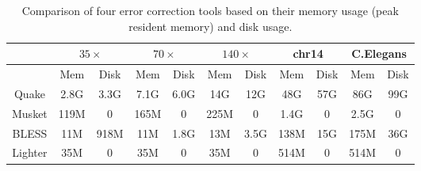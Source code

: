 \documentclass{bmcart}
\begin{document}
\begin{backmatter}
\begin{table}[h!] %
\caption{Comparison of four error correction tools based on their memory usage (peak resident memory) and disk usage.\label{table:memory_usage}}
\begin{tabular}{|c|c|c||c|c||c|c||c|c||c|c|} \hline
		& \multicolumn{2}{|c||}{$35\times$} & \multicolumn{2}{|c||}{$70\times$}  & \multicolumn{2}{|c||}{$140\times$} & \multicolumn{2}{|c||}{chr14}  & \multicolumn{2}{|c|}{C.Elegans} \\ \hline
		& Mem & Disk & Mem & Disk & Mem & Disk & Mem & Disk & Mem & Disk \\ \hline
Quake   & 2.8G	& 3.3G & 7.1G & 6.0G & 14G & 12G & 48G & 57G & 86G & 99G \\ \hline		
Musket	& 119M	& 0 & 165M & 0 & 225M & 0 & 1.4G & 0 & 2.5G & 0 \\ \hline
BLESS	& 11M	& 918M & 11M & 1.8G & 13M & 3.5G & 138M & 15G & 175M & 36G \\ \hline
Lighter	& 35M	& 0 & 35M & 0 & 35M & 0 & 514M & 0 & 514M & 0 \\ \hline
\end{tabular}
\end{table}

\end{backmatter}
\end{document}

